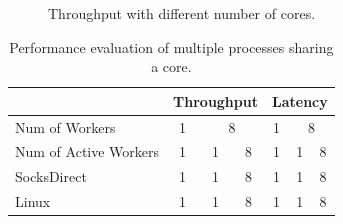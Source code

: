 \begin{figure}[htpb]

	\caption{Throughput with different number of cores.}
	\label{fig:eval-corenum-tput}
\end{figure}


\begin{table}[t]
	\centering
		\begin{tabular}{l|c|c|c|c|c|c|}
			\hline
				& \multicolumn{3}{c|}{Throughput} & \multicolumn{3}{c|}{Latency} \\
			\hline
			Num of Workers	& \multicolumn{1}{c|}{1} & \multicolumn{2}{c|}{8} & \multicolumn{1}{c|}{1} & \multicolumn{2}{c|}{8} \\
			\hline
			Num of Active Workers	& 1 & 1 & 8 & 1 & 1 & 8 \\
			\hline
			\hline
			SocksDirect 	& 1 & 1 & 8 & 1 & 1 & 8 \\
			\hline
			Linux 	& 1 & 1 & 8 & 1 & 1 & 8 \\
			\hline
		\end{tabular}
	\caption{Performance evaluation of multiple processes sharing a core.}
	\label{tab:eval-context-switch}
\end{table}




